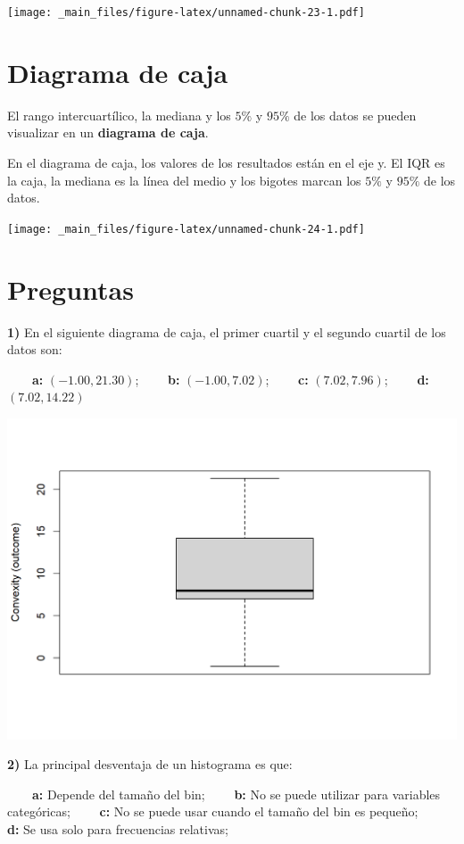 \documentclass[
]{book}
\begin{document}
\texttt{[image: \_main\_files/figure-latex/unnamed-chunk-23-1.pdf]}

\hypertarget{diagrama-de-caja}{%
\section{Diagrama de caja}\label{diagrama-de-caja}}

El rango intercuartílico, la mediana y los \(5\%\) y \(95\%\) de los datos se pueden visualizar en un \textbf{diagrama de caja}.

En el diagrama de caja, los valores de los resultados están en el eje y. El IQR es la caja, la mediana es la línea del medio y los bigotes marcan los \(5\%\) y \(95\%\) de los datos.

\texttt{[image: \_main\_files/figure-latex/unnamed-chunk-24-1.pdf]}

\hypertarget{preguntas}{%
\section{Preguntas}\label{preguntas}}

\textbf{1)} En el siguiente diagrama de caja, el primer cuartil y el segundo cuartil de los datos son:

\textbf{\(\qquad\)a:} \((-1.00, 21.30)\); \textbf{\(\qquad\)b:} \((-1.00, 7.02)\); \textbf{\(\qquad\)c:} \((7.02, 7.96)\); \textbf{\(\qquad\)d:} \((7.02, 14.22)\)

\includegraphics{./figures/box.png}

\textbf{2)} La principal desventaja de un histograma es que:

\textbf{\(\qquad\)a:} Depende del tamaño del bin; \textbf{\(\qquad\)b:} No se puede utilizar para variables categóricas;
\textbf{\(\qquad\)c:} No se puede usar cuando el tamaño del bin es pequeño;
\textbf{\(\qquad\)d:} Se usa solo para frecuencias relativas;
\end{document}
